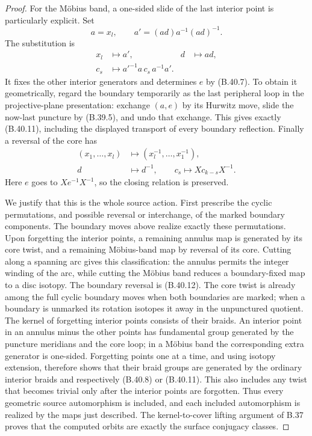 \begin{proof}
For the M\"obius band, a one-sided slide of the last interior point
is particularly explicit.  Set
\[
          a=x_l,\qquad a'=(a d)a^{-1}(a d)^{-1}.
\]
The substitution is
\[
 \begin{aligned}
  x_l&\longmapsto a',& d&\longmapsto a d,\\
  c_s&\longmapsto a'^{-1}a\,c_s\,a^{-1}a'.
 \end{aligned}                                           \tag{B.40.11}
\]
It fixes the other interior generators and determines $e$ by
(B.40.7).  To obtain it geometrically, regard the boundary temporarily
as the last peripheral loop in the projective-plane presentation:
exchange $(a,e)$ by its Hurwitz move, slide the now-last puncture
by (B.39.5), and undo that exchange.  This gives exactly
(B.40.11), including the displayed transport of every boundary
reflection.  Finally a reversal of the core has
\[
 \begin{aligned}
 (x_1,\ldots,x_l)&\longmapsto(x_l^{-1},\ldots,x_1^{-1}),\\
 d&\longmapsto d^{-1},\qquad
 c_s\longmapsto X c_{k-s}X^{-1}.
 \end{aligned}                                           \tag{B.40.12}
\]
Here $e$ goes to $X e^{-1}X^{-1}$, so the closing relation is
preserved.

We justify that this is the whole source action.  First prescribe
the cyclic permutations, and possible reversal or interchange, of
the marked boundary components.  The boundary moves above realize
exactly these permutations.  Upon forgetting the interior points,
a remaining annulus map is generated by its core twist, and a
remaining M\"obius-band map by reversal of its core.  Cutting along
a spanning arc gives this classification: the annulus permits the
integer winding of the arc, while cutting the M\"obius band reduces
a boundary-fixed map to a disc isotopy.  The boundary reversal is
(B.40.12).  The core twist is already among the full cyclic boundary
moves when both boundaries are marked; when a boundary is unmarked
its rotation isotopes it away in the unpunctured quotient.
The kernel of forgetting interior points consists of their braids.
An interior point in an annulus minus the other points has fundamental
group generated by the puncture meridians and the core loop; in a
M\"obius band the corresponding extra generator is one-sided.
Forgetting points one at a time, and using isotopy extension, therefore
shows that their braid groups are generated by the ordinary interior
braids and respectively (B.40.8) or (B.40.11).  This also includes
any twist that becomes trivial only after the interior points are
forgotten.  Thus every geometric source automorphism is included,
and each included automorphism is realized by the maps just described.
The kernel-to-cover lifting argument of B.37 proves that the computed
orbits are exactly the surface conjugacy classes.


\end{proof}
